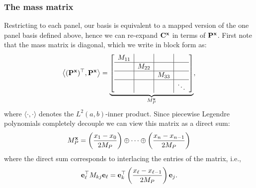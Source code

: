 \documentclass[hidelinks,onefignum,onetabnum]{siamart220329}
\def\bfP{{\bf P}}
\def\bfx{{\bf x}}
\def\bfe{{\bf e}}
\def\pr(#1){\left({#1}\right)}
\def\ip<#1>{\left\langle{#1}\right\rangle}
\begin{document}
\subsubsection{The mass matrix}
Restricting to each panel, our basis is equivalent to a mapped version of the one panel basis defined above, hence we can re-expand ${\bf C}^\bfx$ in terms of $\bfP^\bfx$.  First note that the mass matrix  is diagonal, which we write in block form as:
\[
	\ip<(\bfP^\bfx)^\top, \bfP^\bfx> = \underbrace{\left[\begin{array}{c | c|c |c }
		M_{11} &   &\\
		\hline
		& M_{22}   &   \\
		\hline
		& & M_{33}    \\
		\hline 
		&&  & \ddots 
	\end{array}\right]}_{M_P^\bfx},
\]
where $\langle \cdot, \cdot \rangle$ denotes the $L^2(a,b)$-inner product. Since piecewise Legendre polynomials completely decouple we can view  this matrix as a direct sum:
\[
	M_P^\bfx = \pr({x_1 - x_0 \over 2} M_P) \oplus \cdots \oplus \pr({x_n - x_{n-1} \over 2} M_P)
\]
where the direct sum corresponds to interlacing the entries of the matrix, i.e.,
\[
	\bfe_\ell^\top M_{kj} \bfe_\ell = \bfe_k^\top \pr({x_{\ell} - x_{\ell-1} \over 2} M_P) \bfe_j.
\]
\end{document}
